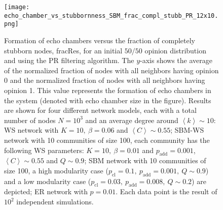 \documentclass[11 pt , letterpaper , twoside , openright]{book}
\begin{document}
\begin{figure}[H]
	\texttt{[image: echo\_chamber\_vs\_stubbornness\_SBM\_frac\_compl\_stubb\_PR\_12x10.png]}
	\captionsetup{format=plain}
	\caption[Formation of echo chambers versus fraction of completely stubborn nodes, PR]{Formation of echo chambers versus the fraction of completely stubborn nodes, fracRes, for an initial $50/50$ opinion distribution and using the PR filtering algorithm. The $y$-axis shows the average of the normalized fraction of nodes with all neighbors having opinion 0 and the normalized fraction of nodes with all neighbors having opinion 1. This value represents the formation of echo chambers in the system (denoted with echo chamber size in the figure). Results are shown for four different network models, each with a total number of nodes $N=10^3$ and an average degree around $\left<k\right> \sim 10$: WS network with $K =10,\ \beta = 0.06$ and $\left<C\right> \sim 0.55$; SBM-WS network with 10 communities of size 100, each community has the following WS parameters: $K = 10,\ \beta = 0.01$ and $p_{\text{add}} = 0.001$, $\left<C\right> \sim 0.55$ and $Q \sim 0.9$; SBM network with 10 communities of size 100, a high modularity case ($p_{\text{cl}} = 0.1,\ p_{\text{add}} = 0.001,\ Q \sim 0.9$) and a low modularity case ($p_{\text{cl}} = 0.03,\ p_{\text{add}} = 0.008,\ Q \sim 0.2$) are depicted; ER network with $p= 0.01$. Each data point is the result of $10^2$ independent simulations.}
\label{echo_vs_frac_complStubb}
\end{figure}
	
\end{document}
